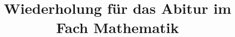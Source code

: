 \documentclass[a4paper,12pt]{article}
\title{Wiederholung für das Abitur im Fach Mathematik}
\date{}
\author{}
\begin{document}
\maketitle
\tableofcontents
\pagebreak






\end{document}
